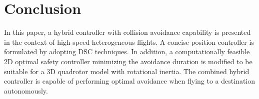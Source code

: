 \documentclass[journal,11pt,onecolumn,draftclsnofoot,]{IEEEtran}
\begin{document}

\section{\textbf{Conclusion}}

In this paper, a hybrid controller with collision avoidance capability is presented in the context of high-speed heterogeneous flights. A concise position controller is formulated by adopting DSC techniques. In addition, a computationally feasible 2D optimal safety controller minimizing the avoidance duration is modified to be suitable for a 3D quadrotor model with rotational inertia. The combined hybrid controller is capable of performing optimal avoidance when flying to a destination autonomously.
\end{document}
